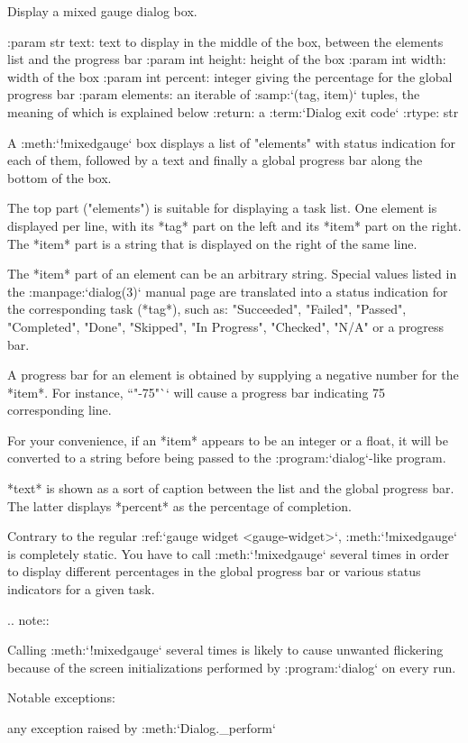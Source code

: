 \begin{DoxyVerb}Display a mixed gauge dialog box.

:param str text:    text to display in the middle of the box,
            between the elements list and the progress
            bar
:param int height:  height of the box
:param int width:   width of the box
:param int percent: integer giving the percentage for the global
            progress bar
:param elements:    an iterable of :samp:`({tag}, {item})`
            tuples, the meaning of which is explained
            below
:return:            a :term:`Dialog exit code`
:rtype:             str

A :meth:`!mixedgauge` box displays a list of "elements" with
status indication for each of them, followed by a text and
finally a global progress bar along the bottom of the box.

The top part ("elements") is suitable for displaying a task
list. One element is displayed per line, with its *tag* part on
the left and its *item* part on the right. The *item* part is a
string that is displayed on the right of the same line.

The *item* part of an element can be an arbitrary string.
Special values listed in the :manpage:`dialog(3)` manual page
are translated into a status indication for the corresponding
task (*tag*), such as: "Succeeded", "Failed", "Passed",
"Completed", "Done", "Skipped", "In Progress", "Checked", "N/A"
or a progress bar.

A progress bar for an element is obtained by supplying a
negative number for the *item*. For instance, ``"-75"`` will
cause a progress bar indicating 75%
corresponding line.

For your convenience, if an *item* appears to be an integer or a
float, it will be converted to a string before being passed to
the :program:`dialog`-like program.

*text* is shown as a sort of caption between the list and the
global progress bar. The latter displays *percent* as the
percentage of completion.

Contrary to the regular :ref:`gauge widget <gauge-widget>`,
:meth:`!mixedgauge` is completely static. You have to call
:meth:`!mixedgauge` several times in order to display different
percentages in the global progress bar or various status
indicators for a given task.

.. note::

   Calling :meth:`!mixedgauge` several times is likely to cause
   unwanted flickering because of the screen initializations
   performed by :program:`dialog` on every run.

Notable exceptions:

  any exception raised by :meth:`Dialog._perform`\end{DoxyVerb}
